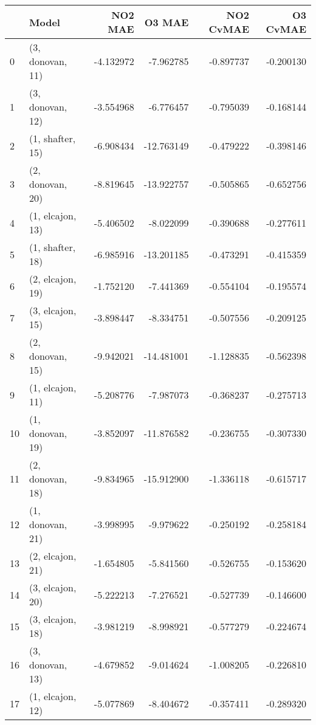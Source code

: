 \begin{tabular}{llrrrr}
\toprule
{} &             Model &   NO2 MAE &     O3 MAE &  NO2 CvMAE &  O3 CvMAE \\
\midrule
0  &  (3, donovan, 11) & -4.132972 &  -7.962785 &  -0.897737 & -0.200130 \\
1  &  (3, donovan, 12) & -3.554968 &  -6.776457 &  -0.795039 & -0.168144 \\
2  &  (1, shafter, 15) & -6.908434 & -12.763149 &  -0.479222 & -0.398146 \\
3  &  (2, donovan, 20) & -8.819645 & -13.922757 &  -0.505865 & -0.652756 \\
4  &  (1, elcajon, 13) & -5.406502 &  -8.022099 &  -0.390688 & -0.277611 \\
5  &  (1, shafter, 18) & -6.985916 & -13.201185 &  -0.473291 & -0.415359 \\
6  &  (2, elcajon, 19) & -1.752120 &  -7.441369 &  -0.554104 & -0.195574 \\
7  &  (3, elcajon, 15) & -3.898447 &  -8.334751 &  -0.507556 & -0.209125 \\
8  &  (2, donovan, 15) & -9.942021 & -14.481001 &  -1.128835 & -0.562398 \\
9  &  (1, elcajon, 11) & -5.208776 &  -7.987073 &  -0.368237 & -0.275713 \\
10 &  (1, donovan, 19) & -3.852097 & -11.876582 &  -0.236755 & -0.307330 \\
11 &  (2, donovan, 18) & -9.834965 & -15.912900 &  -1.336118 & -0.615717 \\
12 &  (1, donovan, 21) & -3.998995 &  -9.979622 &  -0.250192 & -0.258184 \\
13 &  (2, elcajon, 21) & -1.654805 &  -5.841560 &  -0.526755 & -0.153620 \\
14 &  (3, elcajon, 20) & -5.222213 &  -7.276521 &  -0.527739 & -0.146600 \\
15 &  (3, elcajon, 18) & -3.981219 &  -8.998921 &  -0.577279 & -0.224674 \\
16 &  (3, donovan, 13) & -4.679852 &  -9.014624 &  -1.008205 & -0.226810 \\
17 &  (1, elcajon, 12) & -5.077869 &  -8.404672 &  -0.357411 & -0.289320 \\
\bottomrule
\end{tabular}
